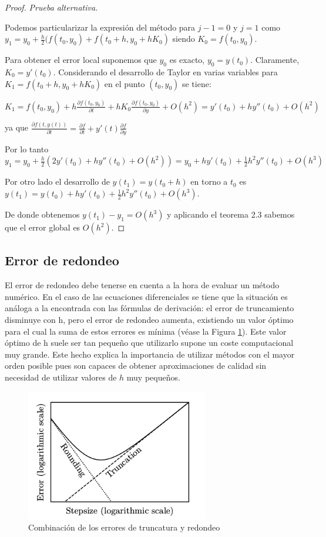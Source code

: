 \documentclass{article}
\theoremstyle{theorem-style}  %
\theoremstyle{definition-style}
\theoremstyle{example-style}
\begin{document}
		\begin{proof} \textit{Prueba alternativa.}
			
			Podemos particularizar la expresión del método para $j-1 = 0$ y $j=1$ como 
			$y_1=y_0+\frac{h}{2}(f(t_0,y_0)+f(t_0+h,y_0+h K_0)$ siendo $K_0=f(t_0,y_0)$. 
			
			Para obtener el error local suponemos que $y_0$ es exacto, $y_0=y(t_0)$. Claramente, $K_0 = y'(t_0)$. Considerando el desarrollo de Taylor en varias variables para $K_1=f(t_0+h,y_0+h K_0)$ en el punto $(t_0,y_0)$ se tiene:

			
			$K_1 = f(t_0,y_0) + h \frac{\partial f(t_0,y_0)}{\partial t}+h K_0\frac{\partial f(t_0,y_0)}{\partial y}+O(h^{2})=y'(t_0)+hy''(t_0)+O(h^{2})$ 
			
			ya que $\frac{\partial f(t,y(t))}{\partial t} = \frac{\partial f}{\partial t} + y'(t)\frac{\partial f}{\partial y}$
			
			Por lo tanto $y_1=y_0+\frac{h}{2}(2y'(t_0)+hy''(t_0)+O(h^2))=y_0+hy'(t_0)+\frac{1}{2}h^{2}y''(t_0)+O(h^3)$
			
			Por otro lado el desarrollo de $y(t_1)=y(t_0 + h)$ en torno a $t_0$ es 
			$y(t_1)=y(t_0)+hy'(t_0)+\frac{1}{2}h^{2}y''(t_0)+O(h^{3})$. 
			
			De donde obtenemos $y(t_1)-y_1=O(h^{3})$ y aplicando el teorema 2.3 sabemos que el error global es $O(h^{2})$.
		\end{proof}
		
	\subsection{Error de redondeo}

		El error de redondeo debe tenerse en cuenta a la hora de evaluar un método numérico. En el caso de las ecuaciones diferenciales se tiene que la situación es análoga a la encontrada con las fórmulas de derivación: el error de truncamiento disminuye con h, pero el error de redondeo aumenta, existiendo un valor óptimo para el cual la suma de estos errores es mínima (véase la Figura \ref{fig:redondeo}). Este valor óptimo de h suele ser tan pequeño que utilizarlo supone un coste computacional muy grande. Este hecho explica la importancia de utilizar métodos con el mayor orden posible pues son capaces de obtener aproximaciones de calidad sin necesidad de utilizar valores de $h$ muy pequeños.
		
		\begin{figure}[H]
			\centering
			\includegraphics[width=8cm]{./Images/redondeo.png}
			\caption{Combinación de los errores de truncatura y redondeo} 
			\label{fig:redondeo}
		\end{figure}
		
\end{document}
